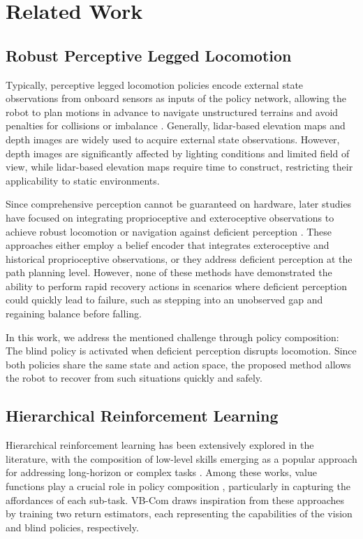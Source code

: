 \section{Related Work} \label{sec:relatedwork}

\subsection{Robust Perceptive Legged Locomotion}

Typically, perceptive legged locomotion policies encode external state observations from onboard sensors as inputs of the policy network, allowing the robot to plan motions in advance to navigate unstructured terrains and avoid penalties for collisions or imbalance \cite{long2024learning, hoeller2024anymal, he2024agile}. Generally, lidar-based elevation maps \cite{miki2022elevation, hoeller2024anymal} and depth images \cite{cheng2024extreme, agarwal2023legged, yu2024walking, luo2024pie} are widely used to acquire external state observations. However, depth images are significantly affected by lighting conditions and limited field of view, while lidar-based elevation maps require time to construct, restricting their applicability to static environments.

Since comprehensive perception cannot be guaranteed on hardware, later studies have focused on integrating proprioceptive and exteroceptive observations to achieve robust locomotion or navigation against deficient perception \cite{miki2022learning, chen2024identifying, zhang2024resilient, fu2022coupling, ren2024top}. These approaches either employ a belief encoder that integrates exteroceptive and historical proprioceptive observations, or they address deficient perception at the path planning level. However, none of these methods have demonstrated the ability to perform rapid recovery actions in scenarios where deficient perception could quickly lead to failure, such as stepping into an unobserved gap and regaining balance before falling.

In this work, we address the mentioned challenge through policy composition: The blind policy is activated when deficient perception disrupts locomotion. Since both policies share the same state and action space, the proposed method allows the robot to recover from such situations quickly and safely.


\subsection{Hierarchical Reinforcement Learning}
Hierarchical reinforcement learning has been extensively explored in the literature, with the composition of low-level skills emerging as a popular approach for addressing long-horizon or complex tasks \cite{peng2019mcp, gupta2023bootstrapped, bacon2017option}. Among these works, value functions play a crucial role in policy composition \cite{shah2021value, nasiriany2022augmenting, zhang2023policy}, particularly in capturing the affordances of each sub-task. VB-Com draws inspiration from these approaches by training two return estimators, each representing the capabilities of the vision and blind policies, respectively.

